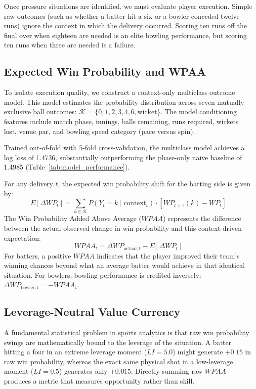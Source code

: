 \documentclass[11pt,a4paper]{article}
\begin{document}
Once pressure situations are identified, we must evaluate player execution. Simple raw outcomes (such as whether a batter hit a six or a bowler conceded twelve runs) ignore the context in which the delivery occurred. Scoring ten runs off the final over when eighteen are needed is an elite bowling performance, but scoring ten runs when three are needed is a failure.

\subsection{Expected Win Probability and WPAA}
To isolate execution quality, we construct a context-only multiclass outcome model. This model estimates the probability distribution across seven mutually exclusive ball outcomes: $\mathcal{K} = \{0, 1, 2, 3, 4, 6, \text{wicket}\}$. The model conditioning features include match phase, innings, balls remaining, runs required, wickets lost, venue par, and bowling speed category (pace versus spin).

Trained out-of-fold with 5-fold cross-validation, the multiclass model achieves a log loss of 1.4736, substantially outperforming the phase-only naive baseline of 1.4985 (Table~\ref{tab:model_performance}).

For any delivery $t$, the expected win probability shift for the batting side is given by:
\begin{equation}
    E[\Delta WP_t] = \sum_{k \in \mathcal{K}} P(Y_t = k \mid \text{context}_t) \cdot \left[ WP_{t+1}(k) - WP_t \right]
\end{equation}
The Win Probability Added Above Average ($WPAA$) represents the difference between the actual observed change in win probability and this context-driven expectation:
\begin{equation}
    WPAA_t = \Delta WP_{\text{actual}, t} - E[\Delta WP_t]
\end{equation}
For batters, a positive $WPAA$ indicates that the player improved their team's winning chances beyond what an average batter would achieve in that identical situation. For bowlers, bowling performance is credited inversely: $\Delta WP_{\text{bowler}, t} = -WPAA_t$.

\subsection{Leverage-Neutral Value Currency}
A fundamental statistical problem in sports analytics is that raw win probability swings are mathematically bound to the leverage of the situation. A batter hitting a four in an extreme leverage moment ($LI = 5.0$) might generate $+0.15$ in raw win probability, whereas the exact same physical shot in a low-leverage moment ($LI = 0.5$) generates only $+0.015$. Directly summing raw $WPAA$ produces a metric that measures opportunity rather than skill.
\end{document}
